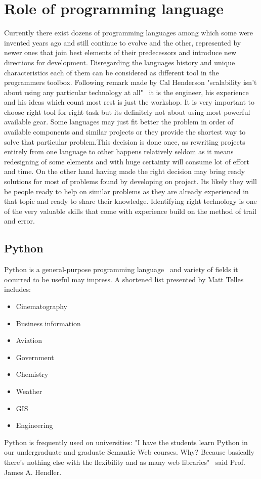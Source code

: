 \section{Role of programming language}\label{sec:languages}
Currently there exist dozens of programming languages among which some were invented years ago and still continue to evolve and the other, represented by newer ones that join best elements of their predecessors and introduce new directions for development. Disregarding the languages history and unique characteristics each of them can be considered as different tool in the programmers toolbox. Following remark made by Cal Henderson "scalability isn't about using any particular technology at all"~\cite[page 203]{build_scalable} it is the engineer, his experience and his ideas which count most rest is just the workshop. It is very important to choose right tool for right task but its definitely not about using most powerful available gear. Some languages may just fit better the problem in order of available components and similar projects or they provide the shortest way to solve that particular problem.This decision is done once, as rewriting projects entirely from one language to other happens relatively seldom as it means redesigning of some elements and with huge certainty will consume lot of effort and time. On the other hand having made the right decision may bring ready solutions for most of problems found by developing on project. Its likely they will be people ready to help on similar problems as they are already experienced in that topic and ready to share their knowledge. Identifying right technology is one of the very valuable skills that come with experience build on the method of trail and error. 
  
\subsection{Python}\label{subsec:py}
Python is a general-purpose programming language~\cite[page 3]{py_nutshell} and variety of fields it occurred to be useful may impress. A shortened list presented by Matt Telles~\cite[page 13]{py_power} includes:
\begin{itemize}
\item{Cinematography}
\item{Business information}
\item{Aviation}
\item{Government}
\item{Chemistry}
\item{Weather}
\item{GIS}
\item{Engineering}
\end{itemize}
Python is frequently used on universities: "I have the students learn Python in our undergraduate and graduate Semantic Web courses. Why? Because basically there's nothing else with the flexibility and as many web libraries"~\cite{py_quote} said Prof. James A. Hendler. 

